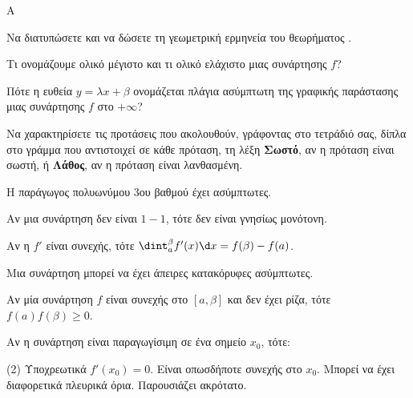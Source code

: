 \begin{thema}{A}
\begin{erwthma}
    \item Να διατυπώσετε και να δώσετε τη γεωμετρική ερμηνεία του θεωρήματος .
    \item Τι ονομάζουμε ολικό μέγιστο και τι ολικό ελάχιστο μιας συνάρτησης $f$?
    \item Πότε η ευθεία $y=\lambda x+\beta$ ονομάζεται πλάγια ασύμπτωτη της γραφικής παράστασης μιας συνάρτησης $f$ στο $+\infty$?
    \item Να χαρακτηρίσετε τις προτάσεις που ακολουθούν, γράφοντας στο τετράδιό σας, δίπλα στο γράμμα που αντιστοιχεί σε κάθε πρόταση, τη λέξη \textbf{Σωστό}, αν η πρόταση είναι σωστή, ή \textbf{Λάθος}, αν η πρόταση είναι λανθασμένη.
    \begin{alist}
        \item Η παράγωγος πολυωνύμου 3ου βαθμού έχει ασύμπτωτες.
        \item Αν μια συνάρτηση δεν είναι $1-1$, τότε δεν είναι γνησίως μονότονη.
        \item Αν η $f'$ είναι συνεχής, τότε $\dint_a^\beta f'(x) \d x = f(\beta) - f(a)$.
        \item Μια συνάρτηση μπορεί να έχει άπειρες κατακόρυφες ασύμπτωτες.
        \item Αν μία συνάρτηση $f$ είναι συνεχής στο $[a, \beta]$ και δεν έχει ρίζα, τότε $f(a)f(\beta) \ge 0$.
    \end{alist}
    \item Αν η συνάρτηση είναι παραγωγίσιμη σε ένα σημείο $x_0$, τότε:
    \begin{tasks}[label=\let\textdexiakeraia\relax\alph*.](2)
        \task Υποχρεωτικά $f'(x_0) = 0$.
        \task Είναι οπωσδήποτε συνεχής στο $x_0$.
        \task Μπορεί να έχει διαφορετικά πλευρικά όρια.
        \task Παρουσιάζει ακρότατο.
    \end{tasks}
\end{erwthma}
\end{thema}


